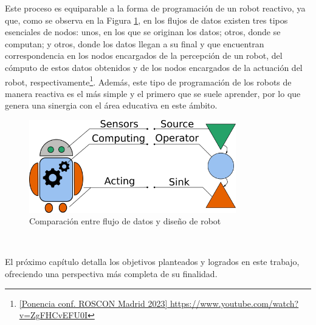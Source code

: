 Este proceso es equiparable a la forma de programación de un robot reactivo, ya
que, como se observa en la Figura \ref{fig:data_flow_vs_robotics}, en los flujos
de datos existen tres tipos esenciales de nodos: unos, en los que se originan
los datos; otros, donde se computan; y otros, donde los datos llegan a su final
y que encuentran correspondencia en los nodos encargados de la percepción de un
robot, del cómputo de estos datos obtenidos y de los nodos encargados de la
actuación del robot, respectivamente\footnote{
\href{https://www.youtube.com/watch?v=ZgFHCvEFU0I}{[Ponencia conf. ROSCON Madrid
2023] https://www.youtube.com/watch?v=ZgFHCvEFU0I}}.
Además, este tipo de programación de los robots de manera reactiva es el más
simple y el primero que se suele aprender, por lo que genera una sinergia con el
área educativa en este ámbito.

\begin{figure} [h!]
  \begin{center}
    \includegraphics[width=9cm]{figs/data-flow_vs_robotics_scheme}
  \end{center}
  \caption{Comparación entre flujo de datos y diseño de robot}
  \label{fig:data_flow_vs_robotics}
\end{figure}\



El próximo capítulo detalla los objetivos planteados y logrados en este trabajo,
ofreciendo una perspectiva más completa de su finalidad.
